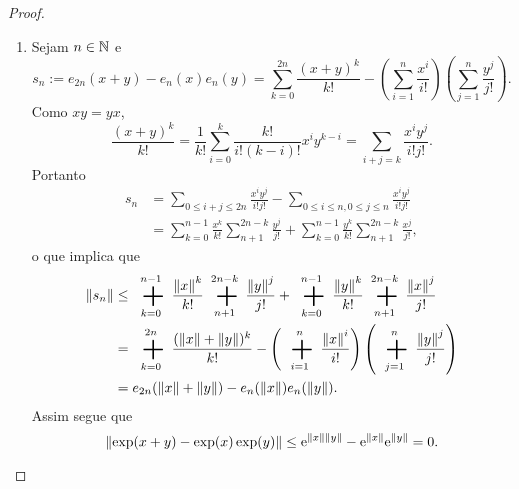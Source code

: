 \begin{proof}
\begin{enumerate}
	\item Sejam $n \in \mathbb{N}$ e
		\begin{equation*}
		s_n := e_{2n}(x+y) - e_n(x)e_n(y) = \sum_{k=0}^{2n} \frac{(x+y)^k}{k!} - \left( \sum_{i=1}^n \frac{x^i}{i!} \right)\left( \sum_{j=1}^n \frac{y^j}{j!} \right).
		\end{equation*}
Como $xy=yx$,
	\begin{equation*}
	\frac{(x+y)^k}{k!} = \frac{1}{k!} \sum_{i=0}^k \frac{k!}{i!(k-i)!}x^i y^{k-i} = \sum_{i+j=k} \frac{x^i y^j}{i!j!}.
	\end{equation*}
Portanto
	\begin{align*}
	s_n &= \sum_{0 \leq i+j \leq 2n} \frac{x^i y^j}{i!j!} - \sum_{0 \leq i \leq n, 0 \leq j \leq n} \frac{x^i y^j}{i!j!} \\
		&= \sum_{k=0}^{n-1} \frac{x^k}{k!} \sum_{n+1}^{2n-k} \frac{y^j}{j!} +  \sum_{k=0}^{n-1} \frac{y^k}{k!} \sum_{n+1}^{2n-k} \frac{x^j}{j!},
	\end{align*}
o que implica que
	\begin{align*}
	\nor{s_n} &\leq \sum_{k=0}^{n-1} \frac{\nor{x}^k}{k!} \sum_{n+1}^{2n-k} \frac{\nor{y}^j}{j!} +  \sum_{k=0}^{n-1} \frac{\nor{y}^k}{k!} \sum_{n+1}^{2n-k} \frac{\nor{x}^j}{j!} \\
		&= \sum_{k=0}^{2n} \frac{(\nor{x}+\nor{y})^k}{k!} - \left( \sum_{i=1}^n \frac{\nor{x}^i}{i!} \right)\left( \sum_{j=1}^n \frac{\nor{y}^j}{j!} \right) \\
		&= e_{2n}(\nor{x}+\nor{y}) - e_n(\nor{x})e_n(\nor{y}).
	\end{align*}
Assim segue que
	\begin{equation*}
	\left\Vert{\exp(x+y) - \exp(x)\exp(y)}\right\Vert \leq \mathrm{e}^{\left\Vert{x}\right\Vert\left\Vert{y}\right\Vert}-\mathrm{e}^{\left\Vert{x}\right\Vert}\mathrm{e}^{\left\Vert{y}\right\Vert} = 0.
	\end{equation*}
	
\begin{comment}
	\item Para todo $n \in \N$, como $xy=yx$,
	\begin{equation*}
	(x+y)^n = \sum_{i=0}^n \frac{n!}{i!(n-i)!}x^i y^{n-i} = n! \sum_{i+j=n} \frac{x^i}{i!}\frac{y^j}{j!}.
	\end{equation*}
Portanto
	\begin{align*}
	\exp(x+y) &= \sum_{n=0}^\infty \frac{(x+y)^n}{n!} \\
		&= \sum_{n=0}^\infty \sum_{i+j=n} \frac{x^i y^j}{i!j!} \\
		&= \left(\sum_{i=0}^\infty \frac{x^i}{i!} \right) \left(\sum_{i=0}^\infty \frac{y^j}{j!} \right) \\
		&= \exp(x) \exp(y).
	\end{align*}
\end{comment}
	

\end{enumerate}
\end{proof}
